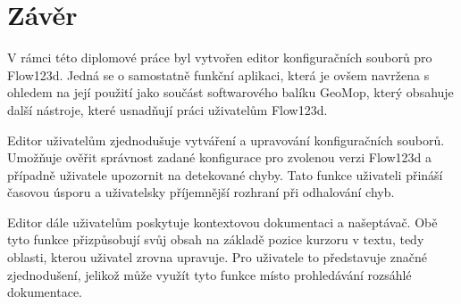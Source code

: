 \documentclass[FM,DP]{tulthesis}
\begin{document}
%
%
%
%
%
%
%
%
%
%
%
%
%
%


\chapter*{Závěr}
V rámci této diplomové práce byl vytvořen editor konfiguračních souborů pro Flow123d. Jedná se o samostatně funkční aplikaci, která je ovšem navržena s ohledem na její použití jako součást softwarového balíku GeoMop, který obsahuje další nástroje, které usnadňují práci uživatelům Flow123d.

Editor uživatelům zjednodušuje vytváření a upravování konfiguračních souborů. Umožňuje ověřit správnost zadané konfigurace pro zvolenou verzi Flow123d a případně uživatele upozornit na detekované chyby. Tato funkce uživateli přináší časovou úsporu a uživatelsky příjemnější rozhraní při odhalování chyb.

Editor dále uživatelům poskytuje kontextovou dokumentaci a našeptávač. Obě tyto funkce přizpůsobují svůj obsah na základě pozice kurzoru v textu, tedy oblasti, kterou uživatel zrovna upravuje. Pro uživatele to představuje značné zjednodušení, jelikož může využít tyto funkce místo prohledávání rozsáhlé dokumentace.
\end{document}
